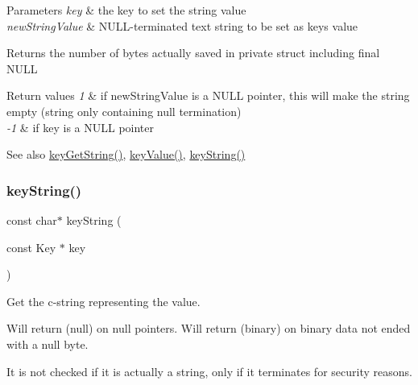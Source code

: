 \begin{DoxyParams}{Parameters}
{\em key} & the key to set the string value \\
\hline
{\em new\+String\+Value} & N\+U\+L\+L-\/terminated text string to be set as {\ttfamily key\textquotesingle{}s} value \\
\hline
\end{DoxyParams}
\begin{DoxyReturn}{Returns}
the number of bytes actually saved in private struct including final N\+U\+LL 
\end{DoxyReturn}

\begin{DoxyRetVals}{Return values}
{\em 1} & if new\+String\+Value is a N\+U\+LL pointer, this will make the string empty (string only containing null termination) \\
\hline
{\em -\/1} & if key is a N\+U\+LL pointer \\
\hline
\end{DoxyRetVals}
\begin{DoxySeeAlso}{See also}
\hyperlink{group__keyvalue_ga41b9fac5ccddafe407fc0ae1e2eb8778}{key\+Get\+String()}, \hyperlink{group__keyvalue_ga6f29609c5da53c6dc26a98678d5752af}{key\+Value()}, \hyperlink{group__keyvalue_ga880936f2481d28e6e2acbe7486a21d05}{key\+String()} 
\end{DoxySeeAlso}
\mbox{\label{group__keyvalue_ga880936f2481d28e6e2acbe7486a21d05}} 
\subsubsection{\texorpdfstring{key\+String()}{keyString()}}
{\footnotesize\ttfamily const char$\ast$ key\+String (\begin{DoxyParamCaption}\item[{const Key $\ast$}]{key }\end{DoxyParamCaption})}



Get the c-\/string representing the value. 

Will return (null) on null pointers. Will return (binary) on binary data not ended with a null byte.

It is not checked if it is actually a string, only if it terminates for security reasons.

